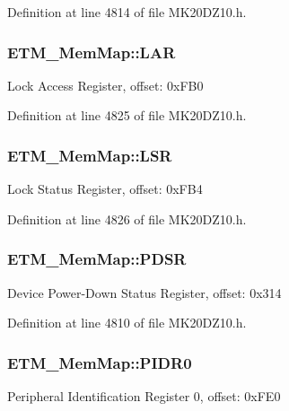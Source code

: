 Definition at line 4814 of file M\+K20\+D\+Z10.\+h.

\subsubsection[{\texorpdfstring{L\+AR}{LAR}}]{ E\+T\+M\+\_\+\+Mem\+Map\+::\+L\+AR}\hypertarget{struct_e_t_m___mem_map_a3e7f9350f82e25fe0112095043733e96}{}\label{struct_e_t_m___mem_map_a3e7f9350f82e25fe0112095043733e96}
Lock Access Register, offset\+: 0x\+F\+B0 

Definition at line 4825 of file M\+K20\+D\+Z10.\+h.

\subsubsection[{\texorpdfstring{L\+SR}{LSR}}]{ E\+T\+M\+\_\+\+Mem\+Map\+::\+L\+SR}\hypertarget{struct_e_t_m___mem_map_a49d085205e5533bde644d064121739f2}{}\label{struct_e_t_m___mem_map_a49d085205e5533bde644d064121739f2}
Lock Status Register, offset\+: 0x\+F\+B4 

Definition at line 4826 of file M\+K20\+D\+Z10.\+h.

\subsubsection[{\texorpdfstring{P\+D\+SR}{PDSR}}]{ E\+T\+M\+\_\+\+Mem\+Map\+::\+P\+D\+SR}\hypertarget{struct_e_t_m___mem_map_a9fa7ceaef6263bb4f389dd0b62517a9e}{}\label{struct_e_t_m___mem_map_a9fa7ceaef6263bb4f389dd0b62517a9e}
Device Power-\/\+Down Status Register, offset\+: 0x314 

Definition at line 4810 of file M\+K20\+D\+Z10.\+h.

\subsubsection[{\texorpdfstring{P\+I\+D\+R0}{PIDR0}}]{ E\+T\+M\+\_\+\+Mem\+Map\+::\+P\+I\+D\+R0}\hypertarget{struct_e_t_m___mem_map_a8e28324e300b4ce198839c4365ac2c19}{}\label{struct_e_t_m___mem_map_a8e28324e300b4ce198839c4365ac2c19}
Peripheral Identification Register 0, offset\+: 0x\+F\+E0 

